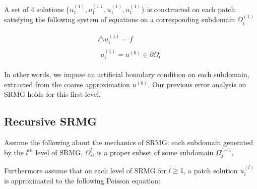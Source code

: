 \documentclass[final]{siamart1116}
\numberwithin{theorem}{section}
\begin{document}



A set of 4 solutions $\{ u^{(1)}_1, u^{(1)}_1, u^{(1)}_1, u^{(1)}_1 \} $  is constructed on each patch satisfying the following system of equations on a corresponding subdomain  $\Omega^{(1)}_i$

\begin{gather}
  \bigtriangleup u^{(1)}_i = f \nonumber \\
  \begin{split}
    u^{(1)}_i = u^{(0)} \in \partial \Omega^{1}_i \label{patchpde1}
  \end{split}
\end{gather}

In other words, we impose an artificial boundary condition on each subdomain, extracted from the coarse approximation $u^{(0)}$. Our previous error analysis on SRMG holds for this first level. 



\subsection{Recursive SRMG}

Assume the following about the mechanics of SRMG: each subdomain generated by the $l^{th}$ level of SRMG, $\Omega^{l}_i$, is a proper subset of some subdomain $\Omega^{l-1}_j$. 

Furthermore assume that on each level of SRMG for $l \geq 1$, a patch solution $u^{(l)}_i$ is approximated to the following Poisson equation:
\end{document}
